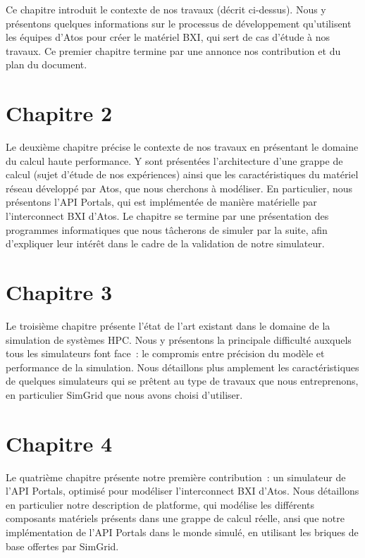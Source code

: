 Ce chapitre introduit le contexte de nos travaux (décrit ci-dessus). Nous y
présentons quelques informations sur le processus de développement qu'utilisent
les équipes d'Atos pour créer le matériel BXI, qui sert de cas d'étude à nos
travaux. Ce premier chapitre termine par une annonce nos contribution et du plan
du document.

\section*{Chapitre 2}

Le deuxième chapitre précise le contexte de nos travaux en présentant le domaine
du calcul haute performance. Y sont présentées l'architecture d'une grappe de
calcul (sujet d'étude de nos expériences) ainsi que les caractéristiques du
matériel réseau développé par Atos, que nous cherchons à modéliser. En
particulier, nous présentons l'API Portals, qui est implémentée de manière
matérielle par l'interconnect BXI d'Atos. Le chapitre se termine par une
présentation des programmes informatiques que nous tâcherons de simuler par la
suite, afin d'expliquer leur intérêt dans le cadre de la validation de notre
simulateur.

\section*{Chapitre 3}

Le troisième chapitre présente l'état de l'art existant dans le domaine de la
simulation de systèmes HPC. Nous y présentons la principale difficulté auxquels
tous les simulateurs font face~: le compromis entre précision du modèle et
performance de la simulation. Nous détaillons plus amplement les
caractéristiques de quelques simulateurs qui se prêtent au type de travaux que
nous entreprenons, en particulier SimGrid que nous avons choisi d'utiliser.


\section*{Chapitre 4}

Le quatrième chapitre présente notre première contribution~: un simulateur de
l'API Portals, optimisé pour modéliser l'interconnect BXI d'Atos. Nous
détaillons en particulier notre description de platforme, qui modélise les
différents composants matériels présents dans une grappe de calcul réelle, ansi
que notre implémentation de l'API Portals dans le monde simulé, en utilisant les
briques de base offertes par SimGrid.

